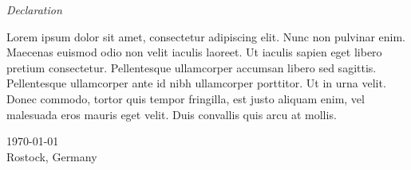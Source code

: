 {\normalfont
\color{uniblau}
\huge\sffamily\itshape
Declaration
}

Lorem ipsum dolor sit amet, consectetur adipiscing elit. Nunc non pulvinar enim. Maecenas euismod odio non velit iaculis laoreet. Ut iaculis sapien eget libero pretium consectetur. Pellentesque ullamcorper accumsan libero sed sagittis. Pellentesque ullamcorper ante id nibh ullamcorper porttitor. Ut in urna velit. Donec commodo, tortor quis tempor fringilla, est justo aliquam enim, vel malesuada eros mauris eget velit. Duis convallis quis arcu at mollis. 

\today \\Rostock, Germany
\\
 \\
\\
\begin{Form}
\end{Form}

\vfill